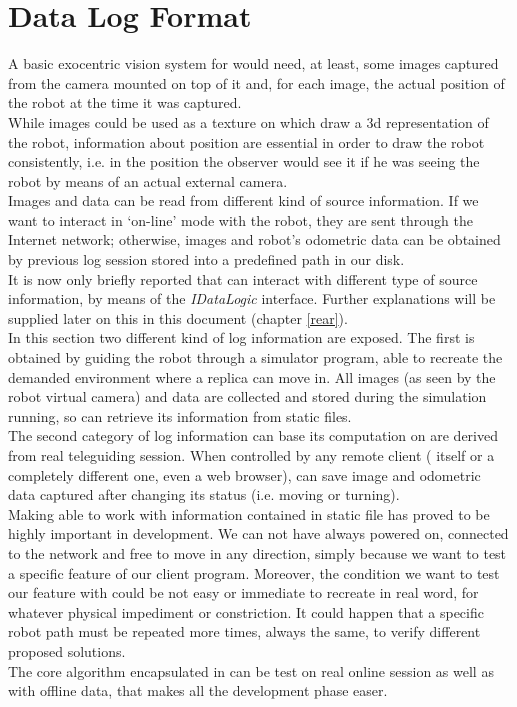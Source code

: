 \setcounter{figure}{0}
\setcounter{table}{0}
\setcounter{lstlisting}{0}

\chapter{Data Log Format}
\label{log}
\minitoc

A basic exocentric vision system for \morduc{} would need, 
at least, some images captured from the camera mounted 
on top of it and, for each image, the actual position of 
the robot at the time it was captured.
\\
While images could be used as a texture on which draw 
a 3d representation of the robot, information about 
position are essential in order to draw the robot 
consistently, i.e. in the position the observer would 
see it if he was seeing the robot by means of an actual 
external camera.
\\
Images and data can be read from different kind of source 
information. If we want to interact in `on-line' mode with
the robot, they are sent through the Internet network;
otherwise, images and robot's odometric data can be
obtained by previous log session stored into a predefined
path in our disk.
\\
It is now only briefly reported that
\framework{} can interact with different type of source
information, by means of the \textit{IDataLogic} interface.
Further explanations will be supplied later on this in this
document (chapter \ref{rear}).
\\
In this section two different kind of log information are
exposed. The first is obtained by guiding the robot through
a simulator program, able to recreate the demanded environment
where a \morduc{} replica can move in. All images (as seen by
the robot virtual camera) and data are collected and stored
during the simulation running, so \framework{} can retrieve
its information from static files.
\\
The second category of log information \framework{} can base
its computation on are derived from real \morduc{} teleguiding
session. When controlled by any remote client (\framework{}
itself or a completely different one, even a web browser),
\morduc{} can save image and odometric data captured after changing
its status (i.e. moving or turning).
\\
Making \framework{} able to work with information contained in
static file has proved to be highly important in development.
We can not have \morduc{} always powered on, connected to the
network and free to move in any direction, simply because
we want to test a specific feature of our client program. Moreover,
the condition we want to test our feature with could be not easy
or immediate to recreate in real word, for whatever physical
impediment or constriction. It could happen that a specific robot
path must be repeated more times, always the same, to verify
different proposed solutions.
\\
The core algorithm encapsulated in \framework{} can be test
on real online session as well as with offline data, that 
makes all the development phase easer.


\clearpage


\clearpage

